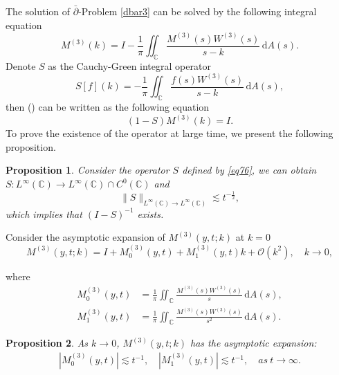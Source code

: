 \documentclass[11pt]{article}
\numberwithin{equation}{section}
\newtheorem{Proposition}{Proposition}
\begin{document}
The solution of $\bar{\partial}$-Problem \ref{dbar3} can be solved by the following integral equation
\begin{equation}\label{eq75}
    M^{(3)}(k) = I - \frac{1}{\pi} \iint_\mathbb{C} \frac{M^{(3)}(s) W^{(3)}(s)}{s - k} \, \mathrm{d}A(s).
\end{equation}
Denote $S$ as the Cauchy-Green integral operator
\begin{equation}\label{eq76}
    S\left[f\right](k) = -\frac{1}{\pi} \iint_\mathbb{C} \frac{f(s) W^{(3)}(s)}{s - k} \, \mathrm{d}A(s),
\end{equation}
then () can be written as the following equation
\begin{equation}\label{eq77}
    (1 - S)M^{(3)}(k) = I.
\end{equation}
To prove the existence of the operator at large time, we present the following proposition.

\begin{Proposition}\label{p34}
    Consider the operator $S$ defined by \eqref{eq76},  we can obtain $S : L^\infty(\mathbb{C}) \to L^\infty(\mathbb{C}) \cap C^0(\mathbb{C})$ and
\begin{equation}
    \|S\|_{L^\infty(\mathbb{C}) \to L^\infty(\mathbb{C})} \lesssim t^{-\frac{1}{2}},
\end{equation}
which implies that $(I-S)^{-1}$ exists.
\end{Proposition}

Consider the asymptotic expansion of $M^{(3)}( y, t;k)$ at $k = 0$
\begin{equation*}
    M^{(3)}(y, t;k) = I + M^{(3)}_0(y, t) + M^{(3)}_1(y, t) k + \mathcal{O}(k^2), \quad k \to 0,
\end{equation*}

where
\begin{align}
    M^{(3)}_0(y, t)& = \frac{1}{\pi} \iint_\mathbb{C} \frac{M^{(3)}(s) W^{(3)}(s)}{s} \, \mathrm{d}A(s),\\
    M^{(3)}_1(y, t)& = \frac{1}{\pi} \iint_\mathbb{C} \frac{M^{(3)}(s) W^{(3)}(s)}{s^2} \, \mathrm{d}A(s).
\end{align}

\begin{Proposition}\label{p35}
As $k \rightarrow 0$, $M^{(3)}(y,t;k)$ has the asymptotic expansion:
\begin{align}
|M^{(3)}_0(y,t)|\lesssim t^{-1},\quad |M^{(3)}_1(y,t)|\lesssim t^{-1},\quad as\ t\rightarrow \infty.
\end{align}
\end{Proposition}
\end{document}
